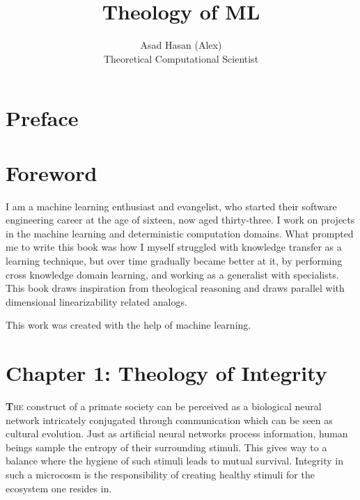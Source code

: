 \documentclass[ebook,12pt,oneside,openany]{memoir}
\title{Theology of ML}
\author{Asad Hasan (Alex) \\ Theoretical Computational Scientist}
\begin{document}
\makeatletter
\renewcommand{\@date}{} %
\makeatother
\maketitle
\chapter*{Preface}


\indent \indent \vspace*{\fill} %


\vspace*{\fill} %
\chapter*{Foreword}


\indent \indent I am a machine learning enthusiast and evangelist, who started their software engineering career at the age of sixteen, now aged thirty-three. I work on projects in the machine learning and deterministic computation domains. What prompted me to write this book was how I myself struggled with knowledge transfer as a learning technique, but over time gradually became better at it, by performing cross knowledge domain learning, and working as a generalist with specialists. This book draws inspiration from theological reasoning and draws parallel with dimensional linearizability related analogs.

\indent 

\indent This work was created with the help of machine learning.
\chapter*{Chapter 1: Theology of Integrity}


\indent \indent \lettrine[lines=2]{\fontsize{48}{56}\selectfont\textbf{T}}{he} construct of a primate society can be perceived as a biological neural network intricately conjugated through communication which can be seen as cultural evolution. Just as artificial neural networks process information, human beings sample the entropy of their surrounding stimuli. This gives way to a balance where the hygiene of such stimuli leads to mutual survival. Integrity in such a microcosm is the responsibility of creating healthy stimuli for the ecosystem one resides in.
\end{document}
